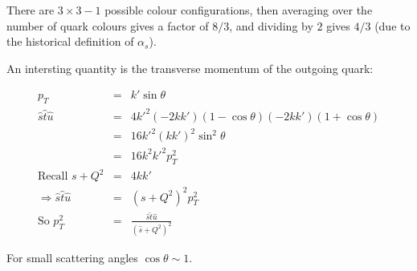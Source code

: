 There are $3\times3-1$ possible colour configurations, then averaging over the number of quark colours gives a factor of $8/3$, and dividing by $2$ gives $4/3$ (due to the historical definition of $\alpha_s$).

An intersting quantity is the transverse momentum of the outgoing quark:

\begin{eqnarray*}
  p_T & = & k'\sin\theta \\
  \hat{s}\hat{t}\hat{u} & = & 4k'^2\left(-2kk'\right)\left(1 - \cos\theta\right)\left(-2kk'\right)\left(1 + \cos\theta\right) \\
  & = & 16k'^2\left(kk'\right)^2\sin^2\theta \\
  & = & 16k^2k'^2p_T^2 \\
  \textrm{Recall } s + Q^2 & = & 4kk' \\
  \Rightarrow \hat{s}\hat{t}\hat{u} & = & \left(s + Q^2\right)^2p_T^2 \\
  \textrm{So } p_T^2 & = & \frac{\hat{s}\hat{t}\hat{u}}{\left(\hat{s} + Q^2\right)^2}
\end{eqnarray*}

For small scattering angles $\cos\theta\sim 1$.

